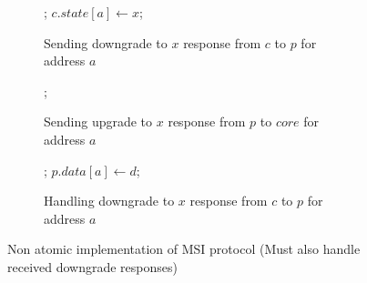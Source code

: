 \begin{figure}
\begin{subfigure}{\linewidth}
\begin{boxedminipage}{\linewidth}
\begin{algorithmic}
      \State \send{} ;
    \EndIf
    \State $c.state[a] \gets x$;
  \EndIf
\EndProc
\end{algorithmic}
\end{boxedminipage}
\caption{Sending downgrade to $x$ response from $c$ to $p$ for address $a$}
\label{dResp}
\end{subfigure}

\begin{subfigure}{\linewidth}
\begin{boxedminipage}{\linewidth}
\begin{algorithmic}
  \State \send{} ;
\EndProc
\end{algorithmic}
\end{boxedminipage}
\caption{Sending upgrade to $x$ response from $p$ to $core$ for address $a$}
\label{uResp}
\end{subfigure}

\begin{subfigure}{\linewidth}
\begin{boxedminipage}{\linewidth}
\begin{algorithmic}
    \State \receive{} ;
    \State $p.data[a] \gets d$;
  \EndIf
\EndProc
\end{algorithmic}
\end{boxedminipage}
\caption{Handling downgrade to $x$ response from $c$ to $p$ for address $a$}
\label{uResp}
\end{subfigure}

\caption{Non atomic implementation of MSI protocol (Must also handle received
downgrade responses)}
\label{realistic}
\end{figure}

